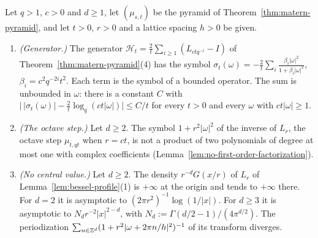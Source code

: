 \begin{proposition}
\label{prop:matern-generator-octave}
\leanok
{}
Let $q > 1$, $c > 0$ and $d \ge 1$, let $(\mu_{s,t})$ be the \Matern{} pyramid of
Theorem~\ref{thm:matern-pyramid}, and let $t > 0$, $r > 0$ and a lattice spacing $h > 0$ be given.
\begin{enumerate}
\item \emph{(Generator.)} The generator $\mathcal{H}_t = \frac2t\sum_{i \ge 1}(L_{ctq^{-i}} - I)$ of
Theorem~\ref{thm:matern-pyramid}(4) has the symbol
$\sigma_t(\omega) = -\frac2t\sum_i\frac{\beta_i|\omega|^2}{1 + \beta_i|\omega|^2}$, $\beta_i =
c^2q^{-2i}t^2$. Each term is the symbol of a bounded operator. The sum is unbounded in $\omega$:
there is a constant $C$ with
$\bigl|\,|\sigma_t(\omega)| - \frac2t\log_q(ct|\omega|)\bigr| \le C/t$ for every $t > 0$ and every
$\omega$ with $ct|\omega| \ge 1$.
\item \emph{(The octave step.)} Let $d \ge 2$. The symbol $1 + r^2|\omega|^2$ of the inverse of
$L_r$, the octave step $\mu_{t,qt}$ when $r = ct$, is not a product of two polynomials of degree at
most one with complex coefficients (Lemma~\ref{lem:no-first-order-factorization}).
\item \emph{(No central value.)} Let $d \ge 2$. The density $r^{-d}G(x/r)$ of $L_r$ of
Lemma~\ref{lem:bessel-profile}(1) is $+\infty$ at the origin and tends to $+\infty$ there. For
$d = 2$ it is asymptotic to $(2\pi r^2)^{-1}\log(1/|x|)$. For $d \ge 3$ it is asymptotic to
$N_dr^{-2}|x|^{2-d}$, with $N_d := \Gamma(d/2 - 1)/(4\pi^{d/2})$. The periodization
$\sum_{n \in \mathbb{Z}^d}(1 + r^2|\omega + 2\pi n/h|^2)^{-1}$ of its transform diverges.
\end{enumerate}

\end{proposition}
